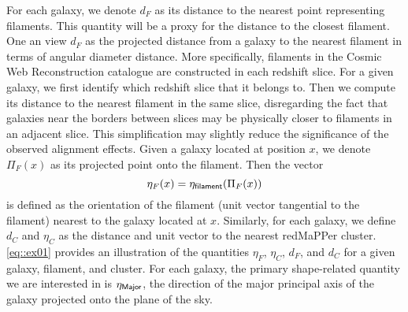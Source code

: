 \documentclass[usenatbib,useAMS]{mnras}
\theoremstyle{remark}
\newcommand{\sukhdeep}[1]{{\textcolor{magenta}{SS: #1}}}
\newcommand{\rachel}[1]{{\textcolor{cyan}{RM: #1}}}
\newcommand{\jab}[1]{{\textcolor{red}{JAB: #1}}}
\begin{document}
        For each galaxy, we denote $d_F$ as its distance to
        the nearest point representing filaments. This quantity will be a proxy for
        the distance to the closest filament. One an view 
        $d_F$ as the projected distance from a galaxy to the nearest filament in terms of angular
        diameter distance. 
        More specifically, filaments in the Cosmic Web Reconstruction catalogue are constructed
        in each redshift slice. For a given galaxy, we first identify which
        redshift slice that it belongs to. 
        Then we compute its distance to the nearest filament in the same slice, disregarding the
        fact that galaxies near the borders between slices may be physically closer to filaments in
        an adjacent slice.  This simplification may slightly reduce the significance of the observed alignment
        effects. 
        Given a galaxy located at position $x$, %
        we denote $\Pi_F(x)$ as its projected point onto the filament.
        Then the vector
        \begin{equation}
        \eta_F(x) = \eta_{\sf filament} (\Pi_F(x))
	\end{equation}
        is defined as the orientation of the filament (unit vector tangential to the filament) nearest to the galaxy located at $x$.
        Similarly, for each galaxy, we define $d_C$ and $\eta_C$ as the distance and unit vector to the nearest redMaPPer cluster.
        \autoref{eq::ex01} provides an illustration of the quantities $\eta_F$, $\eta_C$, $d_F$, and $d_C$ for
        a given galaxy, filament, and cluster.
        For each galaxy, the primary shape-related quantity we are interested in is 
        $\eta_{\sf Major}$, the direction of the major principal axis of the galaxy projected onto the plane of the sky.
        
\end{document}
